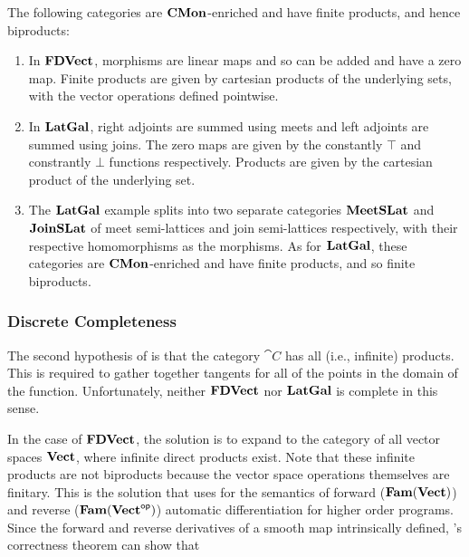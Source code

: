 \begin{example}
  The following categories are $\mathbf{CMon}$-enriched and have finite
  products, and hence biproducts:
  \begin{enumerate}
  \item In $\mathbf{FDVect}$, morphisms are linear maps and so can be added
    and have a zero map. Finite products are given by cartesian
    products of the underlying sets, with the vector operations
    defined pointwise.
  \item In $\mathbf{LatGal}$, right adjoints are summed using meets and left
    adjoints are summed using joins. The zero maps are given by the
    constantly $\top$ and constrantly $\bot$ functions
    respectively. Products are given by the cartesian product of the
    underlying set.
  \item The $\mathbf{LatGal}$ example splits into two separate categories
    $\mathbf{MeetSLat}$ and $\mathbf{JoinSLat}$ of meet semi-lattices and join
    semi-lattices respectively, with their respective homomorphisms as
    the morphisms. As for $\mathbf{LatGal}$, these categories are
    $\mathbf{CMon}$-enriched and have finite products, and so finite
    biproducts.
  \end{enumerate}
\end{example}

\subsubsection{Discrete Completeness}

The second hypothesis of  is that the category
$\cat{C}$ has all (i.e., infinite) products. This is required to
gather together tangents for all of the points in the domain of the
function. Unfortunately, neither $\mathbf{FDVect}$ nor $\mathbf{LatGal}$ is complete
in this sense.

In the case of $\mathbf{FDVect}$, the solution is to expand to the category
of all vector spaces $\mathbf{Vect}$, where infinite direct products
exist. Note that these infinite products are not biproducts because
the vector space operations themselves are finitary. This is the
solution that \cite{vakar2021} uses for the semantics of forward
($\mathbf{Fam}(\mathbf{Vect})$) and reverse ($\mathbf{Fam}(\mathbf{Vect}^{\mathsf{op}})$) automatic
differentiation for higher order programs. Since the forward and
reverse derivatives of a smooth map intrinsically defined,
\citet{vakar2021}'s correctness theorem can show that

